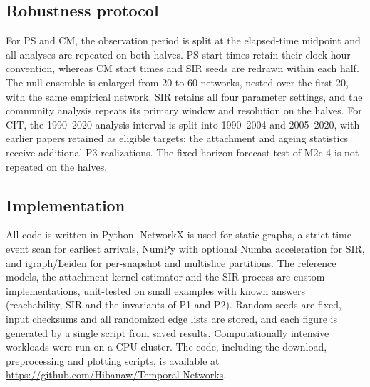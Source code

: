 \subsection{Robustness protocol}
\label{sec:m-robustness}
For PS and CM, the observation period is split at the elapsed-time midpoint and all
analyses are repeated on both halves. PS start times retain their clock-hour convention,
whereas CM start times and SIR seeds are redrawn within each half. The null ensemble is
enlarged from 20 to 60 networks, nested over the first 20, with the same empirical network.
SIR retains all four parameter settings, and the community analysis repeats its primary
window and resolution on the halves. For CIT, the 1990--2020 analysis interval is split
into 1990--2004 and 2005--2020, with earlier papers retained as eligible targets; the
attachment and ageing statistics receive additional P3 realizations. The fixed-horizon
forecast test of M2c-4 is not repeated on the halves.

\subsection{Implementation}
All code is written in Python. NetworkX is used for static graphs, a strict-time event scan
for earliest arrivals, NumPy with optional Numba acceleration for SIR, and igraph/Leiden
for per-snapshot and multislice partitions. The reference models, the attachment-kernel
estimator and the SIR process are custom implementations, unit-tested on small examples
with known answers (reachability, SIR and the invariants of P1 and P2). Random seeds are
fixed, input checksums and all randomized edge lists are stored, and each figure is
generated by a single script from saved results. Computationally intensive workloads were
run on a CPU cluster. The code, including the download, preprocessing and plotting scripts, is available at
\url{https://github.com/Hibanaw/Temporal-Networks}.
